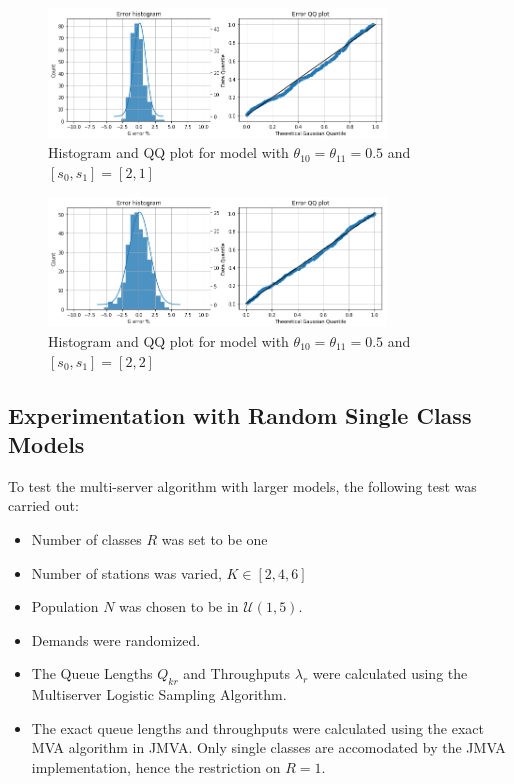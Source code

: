 \begin{figure}[!htb]
\begin{center}
\includegraphics[width=0.8\textwidth]{Chap6_EvaluationAndAnalysis/multiserver/d0_5s21.png}
\caption{ Histogram and QQ plot for model with \(\theta_{10} = \theta_{11} = 0.5\) and \([s_0, s_1] = [2,1]\)}
\label{fig:multiserver_d0_5s21}
\end{center}
\end{figure}

\begin{figure}[!htb]
\begin{center}
\includegraphics[width=0.8\textwidth]{Chap6_EvaluationAndAnalysis/multiserver/d2s22.png}
\caption{ Histogram and QQ plot for model with \(\theta_{10} = \theta_{11} = 0.5\) and \([s_0, s_1] = [2,2]\)}
\label{fig:multiserver_d2s22}\end{center}
\end{figure}

\subsection{Experimentation with Random Single Class Models}
To test the multi-server algorithm with larger models, the following test was carried out:
\begin{itemize}[noitemsep]
    \item Number of classes \(R\) was set to be one
    \item Number of stations was varied, \(K \in [2,4,6]\)
    \item Population \(N\) was chosen to be in \(\mathcal{U}(1,5)\).
    \item Demands were randomized.
    \item The Queue Lengths \(Q_{kr}\) and Throughputs \(\lambda_{r}\) were calculated using the Multiserver Logistic Sampling Algorithm.
    \item The exact queue lengths and throughputs were calculated using the exact MVA algorithm in JMVA. Only single classes are accomodated by the JMVA implementation, hence the restriction on \(R=1\).
\end{itemize}

